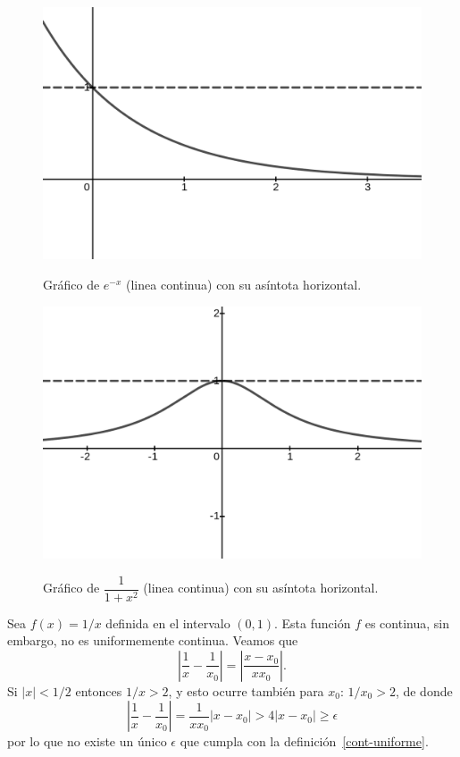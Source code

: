 \documentclass[mid,fleqn,draft,twoside]{notasdeclase}
\begin{document}
\begin{minipage}{.48\linewidth}
	\begin{figure}[H]\centering
		\includegraphics[width=.95\linewidth]{pics/g2}\\ 
		\caption{Gráfico de $e^{-x}$ (linea continua) con su asíntota horizontal.}\label{ch0g2}
	\end{figure}
\end{minipage}
\begin{minipage}{.48\linewidth}
	\begin{figure}[H]\centering
		\includegraphics[width=.95\linewidth]{pics/g3}\\ 
		\caption{Gráfico de $\dfrac{1}{1+x^2}$ (linea continua) con su asíntota horizontal.}
	\end{figure}
\end{minipage}
\begin{cejem}
	Sea $f(x) = 1/x$ definida en el intervalo $(0,1)$. Esta función $f$ es continua, sin embargo, no es uniformemente continua. Veamos que
	\[ \left| \frac 1x - \frac{1}{x_0} \right| = \left| \frac{x-x_0}{xx_0} \right|. \]
	Si $|x|<1/2$ entonces $1/x>2$, y esto ocurre también para $x_0$: $1/x_0>2$, de donde
	\[ \left| \frac 1x - \frac{1}{x_0} \right| = \frac{1}{xx_0}|x-x_0| > 4 |x-x_0|\geq\epsilon \]
	por lo que no existe un único $\epsilon$ que cumpla con la definición~\ref{cont-uniforme}.
\end{cejem}
\end{document}
